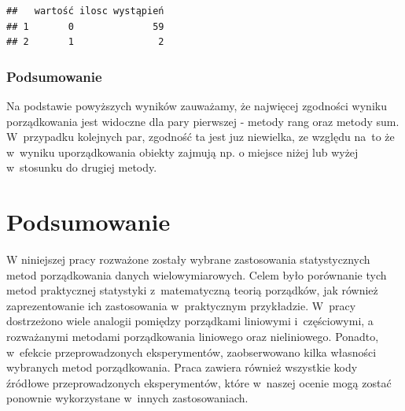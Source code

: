 \documentclass[12pt,a4paper]{report}
\begin{document}
{\begin{verbatim}
##   wartość ilosc wystąpień
## 1       0              59
## 2       1               2
\end{verbatim}

\subsection{Podsumowanie}\label{podsumowanie}

Na podstawie powyższych wyników zauważamy, że najwięcej zgodności wyniku
porządkowania jest widoczne dla pary pierwszej - metody rang oraz metody
sum. W~przypadku kolejnych par, zgodność ta jest juz niewielka, ze
względu na~to że w~wyniku uporządkowania obiekty zajmują np. o miejsce
niżej lub wyżej w~stosunku do drugiej metody.


}
\chapter{Podsumowanie}
W niniejszej pracy rozważone zostały wybrane zastosowania statystycznych metod porządkowania danych wielowymiarowych. Celem było porównanie tych metod praktycznej statystyki z~matematyczną teorią porządków, jak również zaprezentowanie ich zastosowania w~praktycznym przykładzie. W~pracy dostrzeżono wiele analogii pomiędzy porządkami liniowymi i~częściowymi, a rozważanymi metodami porządkowania liniowego oraz nieliniowego. Ponadto, w~efekcie przeprowadzonych eksperymentów, zaobserwowano kilka własności wybranych metod porządkowania. Praca zawiera również wszystkie kody źródłowe przeprowadzonych eksperymentów, które w~naszej ocenie mogą zostać ponownie wykorzystane w~innych zastosowaniach.
\end{document}

